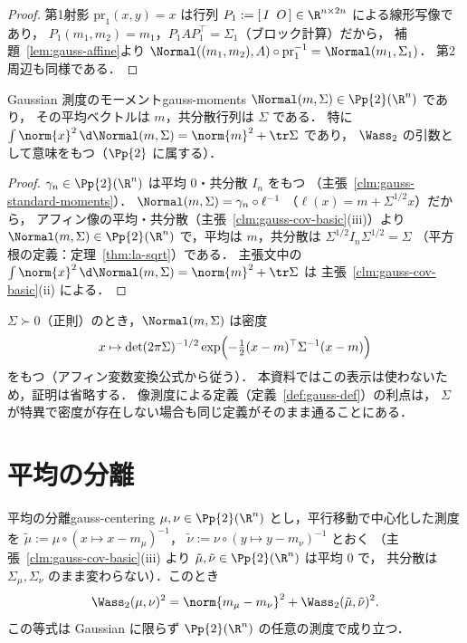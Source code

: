 \begin{proof}
  第1射影 $\mathrm{pr}_1(x,y)=x$ は行列 $P_1:=[\,I\;\;O\,]\in\R^{n\times2n}$
  による線形写像であり，
  $P_1(m_1,m_2)=m_1$，$P_1AP_1^\top=\Sigma_1$（ブロック計算）だから，
  補題~\ref{lem:gauss-affine}より
  $\Normal((m_1,m_2),A)\circ\mathrm{pr}_1^{-1}=\Normal(m_1,\Sigma_1)$．
  第2周辺も同様である．
\end{proof}

\begin{claim}{Gaussian 測度のモーメント}{gauss-moments}
  $\Normal(m,\Sigma)\in\Pp{2}(\R^n)$ であり，
  その平均ベクトルは $m$，共分散行列は $\Sigma$ である．
  特に $\int\norm{x}^2\,\d\Normal(m,\Sigma)=\norm{m}^2+\tr\Sigma$ であり，
  $\Wass_2$ の引数として意味をもつ（$\Pp{2}$ に属する）．
\end{claim}

\begin{proof}
  $\gamma_n\in\Pp{2}(\R^n)$ は平均 $0$・共分散 $I_n$ をもつ
  （主張~\ref{clm:gauss-standard-moments}）．
  $\Normal(m,\Sigma)=\gamma_n\circ\ell^{-1}$
  （$\ell(x)=m+\Sigma^{1/2}x$）だから，
  アフィン像の平均・共分散（主張~\ref{clm:gauss-cov-basic}(iii)）より
  $\Normal(m,\Sigma)\in\Pp{2}(\R^n)$ で，平均は $m$，共分散は
  $\Sigma^{1/2}I_n\Sigma^{1/2}=\Sigma$
  （平方根の定義：定理~\ref{thm:la-sqrt}）である．
  主張文中の $\int\norm{x}^2\,\d\Normal(m,\Sigma)=\norm{m}^2+\tr\Sigma$ は
  主張~\ref{clm:gauss-cov-basic}(ii) による．
\end{proof}

\begin{memo*}
  $\Sigma\succ0$（正則）のとき，$\Normal(m,\Sigma)$ は密度
  \[
    x\mapsto\det(2\pi\Sigma)^{-1/2}
    \exp\Bigl(-\tfrac{1}{2}(x-m)^\top\Sigma^{-1}(x-m)\Bigr)
  \]
  をもつ（アフィン変数変換公式から従う）．
  本資料ではこの表示は使わないため，証明は省略する．
  像測度による定義（定義~\ref{def:gauss-def}）の利点は，
  $\Sigma$ が特異で密度が存在しない場合も同じ定義がそのまま通ることにある．
\end{memo*}

\section{平均の分離}
\label{sec:gauss-centering}

\begin{lemma}{平均の分離}{gauss-centering}
  $\mu,\nu\in\Pp{2}(\R^n)$ とし，平行移動で中心化した測度を
  $\tilde\mu:=\mu\circ(x\mapsto x-m_\mu)^{-1}$，
  $\tilde\nu:=\nu\circ(y\mapsto y-m_\nu)^{-1}$ とおく
  （主張~\ref{clm:gauss-cov-basic}(iii) より
  $\tilde\mu,\tilde\nu\in\Pp{2}(\R^n)$ は平均 $0$ で，
  共分散は $\Sigma_\mu,\Sigma_\nu$ のまま変わらない）．このとき
  \[
    \Wass_2(\mu,\nu)^2
    =\norm{m_\mu-m_\nu}^2+\Wass_2(\tilde\mu,\tilde\nu)^2.
  \]
  この等式は Gaussian に限らず $\Pp{2}(\R^n)$ の任意の測度で成り立つ．
\end{lemma}

